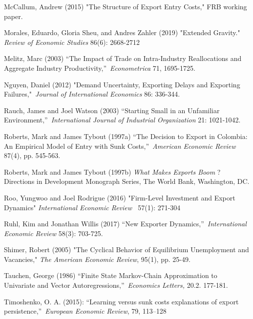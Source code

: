 \documentclass[12pt]{article}
\begin{document}
\begin{description}
\item McCallum, Andrew (2015) "The Structure of Export Entry Costs," FRB
working paper.

\item Morales, Eduardo, Gloria Sheu, and Andres Zahler (2019) "Extended
Gravity." \textit{Review of Economic Studies} 86(6): 2668-2712

\item Melitz, Marc (2003) \textquotedblleft The Impact of Trade on
Intra-Industry Reallocations and Aggregate Industry
Productivity,\textquotedblright\ \textit{Econometrica }71, 1695-1725.

\item Nguyen, Daniel (2012) "Demand Uncertainty, Exporting Delays and
Exporting Failures,"\textit{\ Journal of International Economics }86:
336-344.

\item Rauch, James and Joel Watson (2003) \textquotedblleft Starting Small
in an Unfamiliar Environment,\textquotedblright\ \textit{International
Journal of Industrial Organization} 21: 1021-1042.

\item Roberts, Mark and James Tybout (1997a) \textquotedblleft The Decision
to Export in Colombia: An Empirical Model of Entry with Sunk
Costs,\textquotedblright\ \textit{American Economic Review} 87(4), pp.
545-563.

\item Roberts, Mark and James Tybout (1997b) \textit{What Makes Exports Boom}%
? Directions in Development Monograph Series, The World Bank, Washington, DC.

\item Roo, Yungwoo and Joel Rodrigue (2016) "Firm-Level Investment and
Export Dynamics" \textit{International Economic Review \ }57(1): 271-304

\item Ruhl, Kim and Jonathan Willis (2017) \textquotedblleft New Exporter
Dynamics,\textquotedblright\ \textit{International Economic Review} 58(3):
703-725.

\item Shimer, Robert (2005) "The Cyclical Behavior of Equilibrium
Unemployment and Vacancies," \textit{The American Economic Review}, 95(1),
pp. 25-49.

\item Tauchen, George (1986) \textquotedblleft Finite State Markov-Chain
Approximation to Univariate and Vector Autoregressions,\textquotedblright\ 
\textit{Economics Letters,} 20.2. 177-181.

\item Timoshenko, O. A. (2015): \textquotedblleft Learning versus sunk costs
explanations of export persistence,\textquotedblright\ \textit{European
Economic Review}, 79, 113--128\pagebreak
\end{description}
\end{document}
